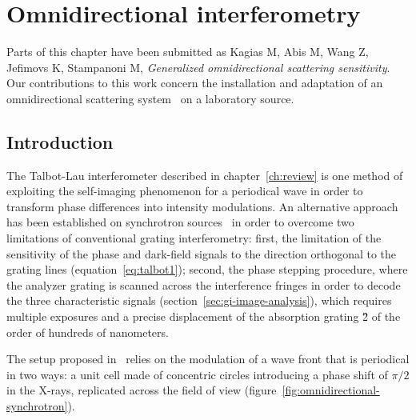 \chapter{Omnidirectional interferometry}\label{ch:omnidirectional}
Parts of this chapter have been submitted as Kagias M, Abis M, Wang Z,
Jefimovs K, Stampanoni M,
\emph{Generalized omnidirectional scattering sensitivity}. Our contributions
to this work concern the installation and adaptation of an omnidirectional scattering
system~\parencite{PhysRevLett.116.093902} on a laboratory source.

\section{Introduction}
The Talbot-Lau interferometer described in chapter~\ref{ch:review} is one
method of exploiting the self-imaging phenomenon for a periodical wave in
order to transform phase differences into intensity modulations.
An alternative approach has been established on synchrotron
sources~\parencite{PhysRevLett.116.093902} in order to overcome two limitations
of conventional grating interferometry: first, the limitation of the sensitivity of
the phase and dark-field signals to the direction orthogonal to the grating
lines (equation~\ref{eq:talbot1}); second, the phase stepping procedure, where
the analyzer grating is scanned across the interference fringes in order to
decode the three characteristic signals
(section~\ref{sec:gi-image-analysis}), which requires multiple exposures and
a precise displacement of the absorption grating \G2 of the order of
hundreds of nanometers.

The setup proposed in~\parencite{PhysRevLett.116.093902} relies on the modulation
of a wave front that is periodical in two ways: a unit cell made of
concentric circles introducing a phase shift of $\pi/2$ in the X-rays,
replicated across the field of view
(figure~\ref{fig:omnidirectional-synchrotron}).

